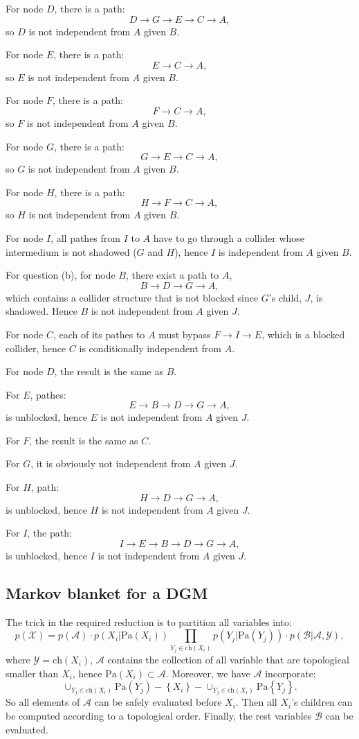 \documentclass[UTF8]{ctexart}
\begin{document}
For node $D$, there is a path:
$$D\rightarrow G\rightarrow E\rightarrow C\rightarrow A,$$
so $D$ is not independent from $A$ given $B$.

For node $E$, there is a path:
$$E\rightarrow C\rightarrow A,$$
so $E$ is not independent from $A$ given $B$.

For node $F$, there is a path:
$$F\rightarrow C\rightarrow A,$$
so $F$ is not independent from $A$ given $B$.

For node $G$, there is a path:
$$G\rightarrow E\rightarrow C\rightarrow A,$$
so $G$ is not independent from $A$ given $B$.

For node $H$, there is a path:
$$H\rightarrow F\rightarrow C\rightarrow A,$$
so $H$ is not independent from $A$ given $B$.

For node $I$, all pathes from $I$ to $A$ have to go through a collider whose intermedium is not shadowed ($G$ and $H$), hence $I$ is independent from $A$ given $B$.

For question (b), for node $B$, there exist a path to $A$,
$$B\rightarrow D \rightarrow G \rightarrow A,$$
which contains a collider structure that is not blocked since $G$'s child, $J$, is shadowed.
Hence $B$ is not independent from $A$ given $J$.

For node $C$, each of its pathes to $A$ must bypass $F\rightarrow I \rightarrow E$, which is a blocked collider, hence $C$ is conditionally independent from $A$.

For node $D$, the result is the same as $B$.

For $E$, pathes:
$$E\rightarrow B\rightarrow D\rightarrow G\rightarrow A,$$
is unblocked, hence $E$ is not independent from $A$ given $J$.

For $F$, the result is the same as $C$.

For $G$, it is obviously not independent from $A$ given $J$.

For $H$, path:
$$H\rightarrow D\rightarrow G\rightarrow A,$$
is unblocked, hence $H$ is not independent from $A$ given $J$.

For $I$, the path:
$$I\rightarrow E\rightarrow B\rightarrow D\rightarrow G\rightarrow A,$$
is unblocked, hence $I$ is not independent from $A$ given $J$.

\subsection{Markov blanket for a DGM}
The trick in the required reduction is to partition all variables into:
$$p(\mathcal{X})=p(\mathcal{A})\cdot p(X_{i}|\text{Pa}(X_{i}))\prod_{Y_{j}\in\text{ch}(X_{i})}p(Y_{j}|\text{Pa}(Y_{j}))\cdot p(\mathcal{B}|\mathcal{A},\mathcal{Y}),$$
where $\mathcal{Y}=\text{ch}(X_{i})$, $\mathcal{A}$ contains the collection of all variable that are topological smaller than $X_{i}$, hence $\text{Pa}(X_{i})\subset \mathcal{A}$.
Moreover, we have $\mathcal{A}$ incorporate:
$$\cup_{Y_{j}\in\text{ch}(X_{i})}\text{Pa}(Y_{j})-\left\{X_{i} \right\}-\cup_{Y_{j}\in\text{ch}(X_{i})}\text{Pa}\left\{Y_{j}\right\}.$$
So all elements of $\mathcal{A}$ can be safely evaluated before $X_{i}$.
Then all $X_{i}$'s children can be computed according to a topological order.
Finally, the rest variables $\mathcal{B}$ can be evaluated.
\end{document}
